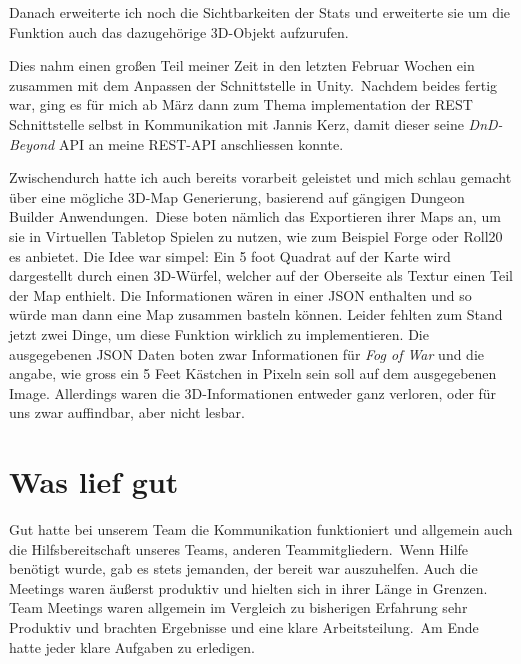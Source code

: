 \documentclass[11pt]{article}
\begin{document}
    Danach erweiterte ich noch die Sichtbarkeiten der Stats und erweiterte sie um die Funktion auch das dazugehörige 3D-Objekt
    aufzurufen.

    Dies nahm einen großen Teil meiner Zeit in den letzten Februar Wochen ein zusammen mit dem Anpassen der Schnittstelle
    in Unity.\ Nachdem beides fertig war, ging es für mich ab März dann zum Thema implementation der REST Schnittstelle
    selbst in Kommunikation mit Jannis Kerz, damit dieser seine \textit{DnD-Beyond} API an meine REST-API anschliessen
    konnte.

    Zwischendurch hatte ich auch bereits vorarbeit geleistet und mich schlau gemacht über eine mögliche 3D-Map Generierung,
    basierend auf gängigen Dungeon Builder Anwendungen.\ Diese boten nämlich das Exportieren ihrer Maps an, um sie in
    Virtuellen Tabletop Spielen zu nutzen, wie zum Beispiel Forge oder Roll20 es anbietet.
    Die Idee war simpel: Ein 5 foot Quadrat auf der Karte wird dargestellt durch einen 3D-Würfel, welcher auf der
    Oberseite als Textur einen Teil der Map enthielt.
    Die Informationen wären in einer JSON enthalten und so würde man dann eine Map zusammen basteln können.
    Leider fehlten zum Stand jetzt zwei Dinge, um diese Funktion wirklich zu implementieren.
    Die ausgegebenen JSON Daten boten zwar Informationen für \textit{Fog of War} und die angabe, wie gross ein 5 Feet
    Kästchen in Pixeln sein soll auf dem ausgegebenen Image.
    Allerdings waren die 3D-Informationen entweder ganz verloren, oder für uns zwar auffindbar, aber nicht lesbar.

    \section{Was lief gut}\label{sec:chapter_goodthings}
    Gut hatte bei unserem Team die Kommunikation funktioniert und allgemein auch die Hilfsbereitschaft unseres Teams,
    anderen Teammitgliedern.\ Wenn Hilfe benötigt wurde, gab es stets jemanden, der bereit war auszuhelfen.
    Auch die Meetings waren äußerst produktiv und hielten sich in ihrer Länge in Grenzen.
    Team Meetings waren allgemein im Vergleich zu bisherigen Erfahrung sehr Produktiv und brachten Ergebnisse und eine
    klare Arbeitsteilung.\ Am Ende hatte jeder klare Aufgaben zu erledigen.
\end{document}
